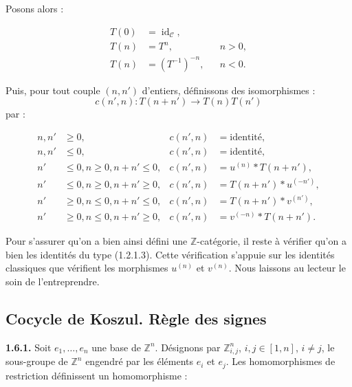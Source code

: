 %
Posons alors :

\begin{equation}
  \begin{aligned}
    T(0)&=\operatorname{id}_{\mathcal C},\\
    T(n)&=T^n, && n>0,\\
    T(n)&=(T^{-1})^{-n}, && n<0.
  \end{aligned}
  \tag{1.5.14.3}
\end{equation}

Puis, pour tout couple $(n,n')$ d'entiers, définissons des
isomorphismes :
\[
  c(n',n)\colon T(n+n')\longrightarrow T(n)T(n')
\]
par :

\begin{equation}
  \begin{aligned}
    n,n'&\geq 0,
      &c(n',n)&=\text{identité},\\
    n,n'&\leq 0,
      &c(n',n)&=\text{identité},\\
    n'&\leq 0, n\geq 0, n+n'\leq 0,
      &c(n',n)&=u^{(n)}\mathbin{*}T(n+n'),\\
    n'&\leq 0, n\geq 0, n+n'\geq 0,
      &c(n',n)&=T(n+n')\mathbin{*}u^{(-n')},\\
    n'&\geq 0, n\leq 0, n+n'\leq 0,
      &c(n',n)&=T(n+n')\mathbin{*}v^{(n')},\\
    n'&\geq 0, n\leq 0, n+n'\geq 0,
      &c(n',n)&=v^{(-n)}\mathbin{*}T(n+n').
  \end{aligned}
  \tag{1.5.14.4}
\end{equation}

Pour s'assurer qu'on a bien ainsi défini une $\mathbb Z$-catégorie, il
reste à vérifier qu'on a bien les identités du type (1.2.1.3). Cette
vérification s'appuie sur les identités classiques que vérifient les
morphismes $u^{(n)}$ et $v^{(n)}$. Nous laissons au lecteur le soin de
l'entreprendre.

\subsection{Cocycle de Koszul. Règle des signes}

\noindent\textbf{1.6.1.}\quad
Soit $e_1,\ldots,e_n$ une base de $\mathbb Z^n$. Désignons par
$\mathbb Z^n_{i,j}$, $i,j\in[1,n]$, $i\neq j$, le sous-groupe de
$\mathbb Z^n$ engendré par les éléments $e_i$ et $e_j$. Les
homomorphismes de restriction définissent un homomorphisme :

